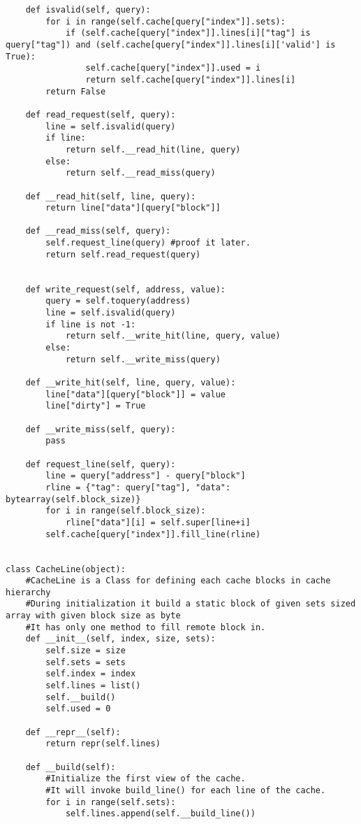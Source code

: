 \begin{lstlisting}
    def isvalid(self, query):
        for i in range(self.cache[query["index"]].sets):
            if (self.cache[query["index"]].lines[i]["tag"] is query["tag"]) and (self.cache[query["index"]].lines[i]['valid'] is True):
                self.cache[query["index"]].used = i
                return self.cache[query["index"]].lines[i]
        return False

    def read_request(self, query):
        line = self.isvalid(query)
        if line:
            return self.__read_hit(line, query)
        else:
            return self.__read_miss(query)

    def __read_hit(self, line, query):
        return line["data"][query["block"]]

    def __read_miss(self, query):
        self.request_line(query) #proof it later.
        return self.read_request(query)


    def write_request(self, address, value):
        query = self.toquery(address)
        line = self.isvalid(query)
        if line is not -1:
            return self.__write_hit(line, query, value)
        else:
            return self.__write_miss(query)

    def __write_hit(self, line, query, value):
        line["data"][query["block"]] = value
        line["dirty"] = True

    def __write_miss(self, query):
        pass

    def request_line(self, query):
        line = query["address"] - query["block"]
        rline = {"tag": query["tag"], "data": bytearray(self.block_size)}
        for i in range(self.block_size):
            rline["data"][i] = self.super[line+i]
        self.cache[query["index"]].fill_line(rline)


class CacheLine(object):
    #CacheLine is a Class for defining each cache blocks in cache hierarchy
    #During initialization it build a static block of given sets sized array with given block size as byte
    #It has only one method to fill remote block in.
    def __init__(self, index, size, sets):
        self.size = size
        self.sets = sets
        self.index = index
        self.lines = list()
        self.__build()
        self.used = 0

    def __repr__(self):
        return repr(self.lines)

    def __build(self):
        #Initialize the first view of the cache.
        #It will invoke build_line() for each line of the cache.
        for i in range(self.sets):
            self.lines.append(self.__build_line())


\end{lstlisting}

